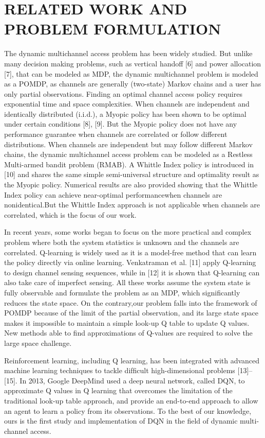 \section{  RELATED WORK AND  PROBLEM FORMULATION  }
The dynamic multichannel access problem has been widely studied. But unlike many decision making problems, such as vertical handoff [6] and power allocation [7], that can
be modeled as MDP, the dynamic multichannel problem is modeled as a POMDP, as channels are generally (two-state) Markov chains and a user has only partial observations. Finding an optimal channel access policy requires exponential time and space complexities. When channels are independent and identically distributed (i.i.d.), a Myopic policy has been shown to be optimal under certain conditions [8], [9]. But the Myopic policy does not have any performance guarantee when channels are correlated or follow different distributions. When channels are independent but may follow different Markov chains, the dynamic multichannel access problem can be modeled as a Restless Multi-armed bandit problem (RMAB). A Whittle Index policy is introduced in [10] and shares the same simple semi-universal structure and optimality result as the Myopic policy. Numerical results are also provided showing that the Whittle Index policy can achieve near-optimal performancewhen channels are nonidentical.But the Whittle Index approach is not applicable when channels are correlated, which is the focus of our work. 

In recent years, some works began to focus on the more practical and complex problem where both the system statistics is unknown and the channels are correlated. Q-learning is widely used as it is a model-free method that can learn the policy directly via online learning. Venkatraman et al. [11] apply Q-learning to design channel sensing sequences, while in [12] it is shown that Q-learning can also take care of imperfect sensing. All these works assume the system state is fully observable and formulate the problem as an MDP, which signiﬁcantly reduces the state space. On the contrary,our problem falls into the framework of POMDP because of the limit of the partial observation, and its large state space makes it impossible to maintain a simple look-up Q table to update Q values. New methods able to ﬁnd approximations of Q-values are required to solve the large space challenge. 

Reinforcement learning, including Q learning, has been integrated with advanced machine learning techniques to tackle difﬁcult high-dimensional problems [13]–[15]. In 2013, Google DeepMind used a deep neural network, called DQN, to approximate Q values in Q learning that overcomes the limitation of the traditional look-up table approach, and provide an end-to-end approach to allow an agent to learn a policy from its observations. To the best of our knowledge, ours is the ﬁrst study and implementation of DQN in the ﬁeld of dynamic multi-channel access.


